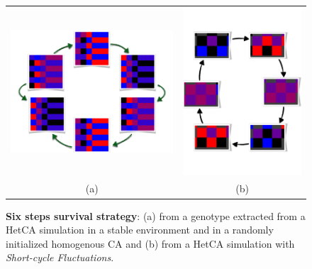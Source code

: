 \begin{figure}[h]
\centering
\begin{tabular}{cc}
    \includegraphics[width=0.45\columnwidth]{img/4steptransition}& \includegraphics[width=0.45\columnwidth]{img/cyclesReal}\\
    (a) & (b)
\end{tabular}
\caption{\textbf{Six steps survival strategy}: (a) from a genotype extracted from a HetCA simulation in a stable environment and in a randomly initialized homogenous CA and (b) from a HetCA simulation with \emph{Short-cycle Fluctuations}. }
  \label{foursteps}
\end{figure}
 







